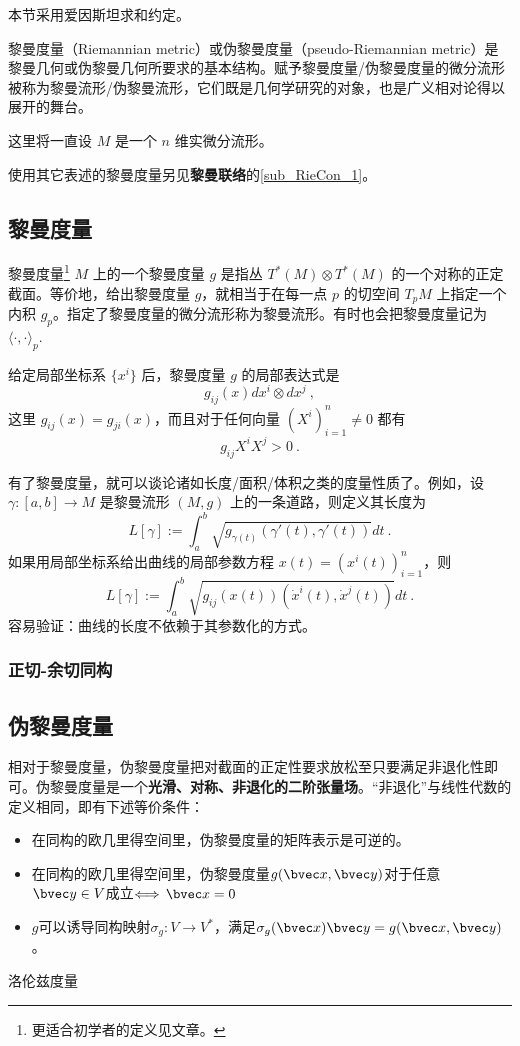 
本节采用爱因斯坦求和约定。

黎曼度量（Riemannian metric）或伪黎曼度量（pseudo-Riemannian metric）是黎曼几何或伪黎曼几何所要求的基本结构。赋予黎曼度量/伪黎曼度量的微分流形被称为黎曼流形/伪黎曼流形，它们既是几何学研究的对象，也是广义相对论得以展开的舞台。

这里将一直设 $M$ 是一个 $n$ 维实微分流形。

使用其它表述的黎曼度量另见\textbf{黎曼联络}的\autoref{sub_RieCon_1}。

\subsection{黎曼度量}
\begin{definition}{黎曼度量\footnote{更适合初学者的定义见文章。}}
$M$ 上的一个黎曼度量 $g$ 是指丛 $T^*(M)\otimes T^*(M)$ 的一个对称的正定截面。等价地，给出黎曼度量 $g$，就相当于在每一点 $p$ 的切空间 $T_pM$ 上指定一个内积 $g_p$。指定了黎曼度量的微分流形称为黎曼流形。有时也会把黎曼度量记为 $\langle\cdot,\cdot\rangle_p$.
\end{definition}
给定局部坐标系 $\{x^i\}$ 后，黎曼度量 $g$ 的局部表达式是
$$
g_{ij}(x)dx^i\otimes dx^j~,
$$
这里 $g_{ij}(x)=g_{ji}(x)$，而且对于任何向量 $(X^i)_{i=1}^n\neq0$ 都有
$$
g_{ij}X^iX^j>0~.
$$

有了黎曼度量，就可以谈论诸如长度/面积/体积之类的度量性质了。例如，设 $\gamma:[a,b]\to M$ 是黎曼流形 $(M,g)$ 上的一条道路，则定义其长度为
$$
L[\gamma]:=\int_{a}^b \sqrt{g_{\gamma(t)}(\gamma'(t),\gamma'(t))}dt~.
$$
如果用局部坐标系给出曲线的局部参数方程 $x(t)=(x^i(t))_{i=1}^n$，则
$$
L[\gamma]:=\int_{a}^b \sqrt{g_{ij}(x(t))(\dot x^i(t),\dot x^j(t))}dt~.
$$
容易验证：曲线的长度不依赖于其参数化的方式。
\subsubsection{正切-余切同构}
\subsection{伪黎曼度量}
相对于黎曼度量，伪黎曼度量把对截面的正定性要求放松至只要满足非退化性即可。伪黎曼度量是一个\textbf{光滑、对称、非退化的二阶张量场}。“非退化”与线性代数的定义相同，即有下述等价条件：
\begin{itemize}
\item 在同构的欧几里得空间里，伪黎曼度量的矩阵表示是可逆的。
\item 在同构的欧几里得空间里，伪黎曼度量$g(\bvec x,\bvec y)$对于任意$\bvec y\in V$成立$\Longleftrightarrow\,\bvec x=0$
\item $g$可以诱导同构映射$\sigma_g:V\rightarrow V^*$，满足$\sigma_g(\bvec x)\bvec y=g(\bvec x,\bvec y)$。
\end{itemize}
\begin{example}{洛伦兹度量}

\end{example}